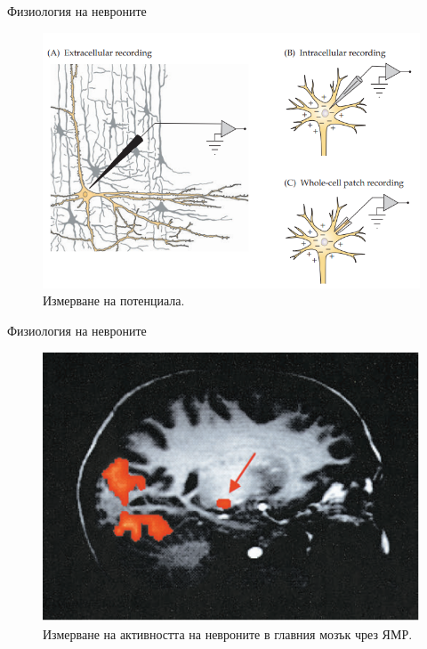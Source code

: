 \begin{frame}[t]{Физиология на невроните}
  \begin{figure}[htbp!]
    \centering
    \includegraphics[width=\textwidth,height=0.7\textheight,keepaspectratio]{electrical-recording.PNG}
    \caption{Измерване на потенциала. \cite[Фиг 1.7]{Neuron}}
  \end{figure}
\end{frame}

\begin{frame}[t]{Физиология на невроните}
  \begin{figure}[htbp!]
    \centering
    \includegraphics[width=\textwidth,height=0.7\textheight,keepaspectratio]{mri-recording.PNG}
    \caption{Измерване на активността на невроните в главния мозък чрез ЯМР. \cite[Фиг 1.9]{Neuron}}
  \end{figure}
\end{frame}

